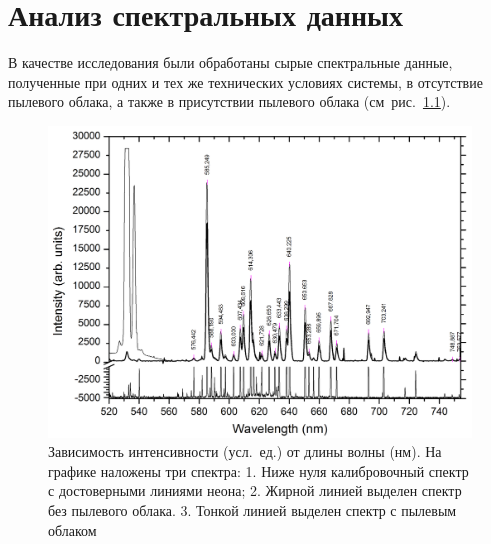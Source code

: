 \chapter{Анализ спектральных данных}
\label{cha:ch_5}

В качестве исследования были обработаны сырые спектральные данные, полученные при одних и тех же
технических условиях системы, в отсутствие пылевого облака, а также в присутствии пылевого облака (см~рис.~\ref{fig:fig34}).

\begin{figure}[t]
    \centering
    \includegraphics[width=16cm]{figures/fig34}
    \caption{
        Зависимость интенсивности (усл.~ед.) от длины волны (нм). На графике наложены три спектра:
        1. Ниже нуля калибровочный спектр с достоверными линиями неона;
        2. Жирной линией выделен спектр без пылевого облака.
        3. Тонкой линией выделен спектр с пылевым облаком
    }
    \label{fig:fig34}
\end{figure}


